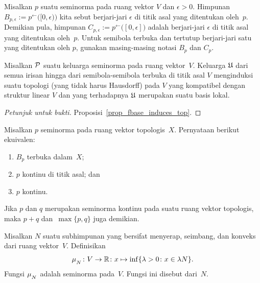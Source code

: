 \begin{defn} Misalkan $p$ suatu seminorma pada ruang vektor $V$ dan $\epsilon > 0$. Himpunan
$B_{p,\epsilon} := p^{\gets}\bigl([0,\epsilon)\bigr)$ kita sebut
 berjari-jari $\epsilon$ di titik asal yang ditentukan oleh~$p$. Demikian pula, himpunan
%
$C_{p,\epsilon} := p^{\gets}\bigl([0,\epsilon]\bigr)$ adalah
 berjari-jari $\epsilon$ di titik asal yang ditentukan oleh~$p$. Untuk semibola terbuka dan tertutup berjari-jari satu yang ditentukan
oleh $p$, gunakan masing-masing notasi $B_p$ dan $C_p$.
\end{defn}

\begin{prop} Misalkan $\mathcal{P}$ suatu keluarga seminorma pada ruang vektor~$V$. Keluarga $\mathfrak{U}$ dari semua irisan hingga dari semibola-semibola terbuka
di titik asal $V$ menginduksi suatu topologi (yang tidak harus Hausdorff) pada $V$ yang kompatibel dengan struktur linear $V$ dan yang terhadapnya
$\mathfrak{U}$ merupakan suatu basis lokal.
\end{prop}

\begin{proof}[\emph{Petunjuk untuk bukti}] Proposisi~\ref{prop_fbase_induces_top}.  \ns
\end{proof}

\begin{prop} Misalkan $p$ seminorma pada ruang vektor topologis~$X$. Pernyataan berikut ekuivalen:
   \begin{enumerate}[label=\rm{(\alph*)}]
     \item $B_p$ terbuka dalam~$X$;
     \item $p$ kontinu di titik asal; dan
     \item $p$ kontinu.
   \end{enumerate}
\end{prop}

\begin{prop} Jika $p$ dan $q$ merupakan seminorma kontinu pada suatu ruang vektor topologis, maka $p + q$ dan~$\max\{p,q\}$ juga demikian.
\end{prop}

\begin{exam} Misalkan $N$ suatu subhimpunan yang bersifat menyerap, seimbang, dan konveks dari ruang vektor~$V$. Definisikan
   \[ \mu_{{}_{\scriptstyle{N}}}\colon V \rightarrow \mathbb{R} \colon x \mapsto \inf\{\lambda > 0\colon x \in \lambda N\}. \]
Fungsi $\mu_{{}_{\scriptstyle{N}}}$ adalah seminorma pada~$V$. Fungsi ini disebut
 dari~$N$.
\end{exam}

